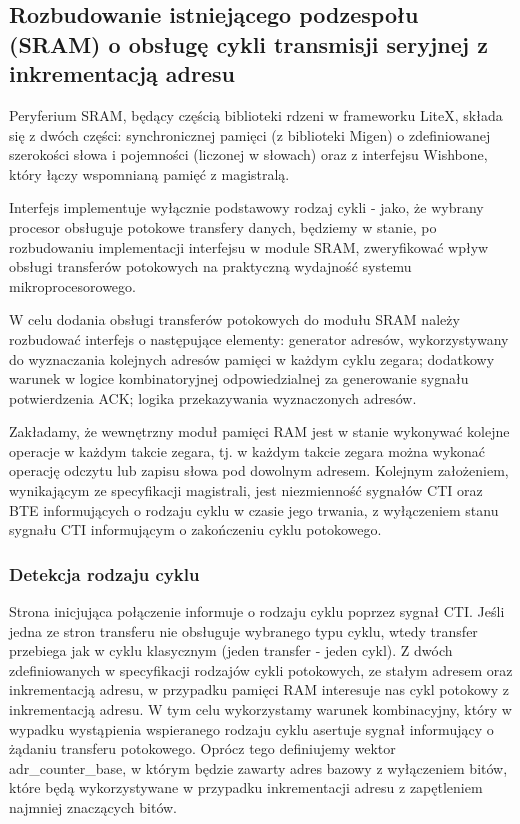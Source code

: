 \subsection{Rozbudowanie istniejącego podzespołu (SRAM) o obsługę cykli transmisji seryjnej z inkrementacją adresu}

Peryferium SRAM, będący częścią biblioteki rdzeni w frameworku LiteX, składa się z dwóch części: synchronicznej pamięci (z biblioteki Migen) o zdefiniowanej szerokości słowa i pojemności (liczonej w słowach) oraz z interfejsu Wishbone, który łączy wspomnianą pamięć z magistralą.


Interfejs implementuje wyłącznie podstawowy rodzaj cykli - jako, że wybrany procesor obsługuje potokowe transfery danych, będziemy w stanie, po rozbudowaniu implementacji interfejsu w module SRAM, zweryfikować wpływ obsługi transferów potokowych na praktyczną wydajność systemu mikroprocesorowego.

W celu dodania obsługi transferów potokowych do modułu SRAM należy rozbudować interfejs o następujące elementy: generator adresów, wykorzystywany do wyznaczania kolejnych adresów pamięci w każdym cyklu zegara; dodatkowy warunek w logice kombinatoryjnej odpowiedzialnej za generowanie sygnału potwierdzenia ACK; logika przekazywania wyznaczonych adresów.

Zakładamy, że wewnętrzny moduł pamięci RAM jest w stanie wykonywać kolejne operacje w każdym takcie zegara, tj. w każdym takcie zegara można wykonać operację odczytu lub zapisu słowa pod dowolnym adresem.
Kolejnym założeniem, wynikającym ze specyfikacji magistrali, jest niezmienność sygnałów CTI oraz BTE informujących o rodzaju cyklu w czasie jego trwania, z wyłączeniem stanu sygnału CTI informującym o zakończeniu cyklu potokowego.

\subsubsection{Detekcja rodzaju cyklu}

Strona inicjująca połączenie informuje o rodzaju cyklu poprzez sygnał CTI. Jeśli jedna ze stron transferu nie obsługuje wybranego typu cyklu, wtedy transfer przebiega jak w cyklu klasycznym (jeden transfer - jeden cykl).
Z dwóch zdefiniowanych w specyfikacji rodzajów cykli potokowych, ze stałym adresem oraz inkrementacją adresu, w przypadku pamięci RAM interesuje nas cykl potokowy z inkrementacją adresu. W tym celu wykorzystamy warunek kombinacyjny, który w wypadku wystąpienia wspieranego rodzaju cyklu asertuje sygnał informujący o żądaniu transferu potokowego.
Oprócz tego definiujemy wektor adr_counter_base, w którym będzie zawarty adres bazowy z wyłączeniem bitów, które będą wykorzystywane w przypadku inkrementacji adresu z zapętleniem najmniej znaczących bitów.

